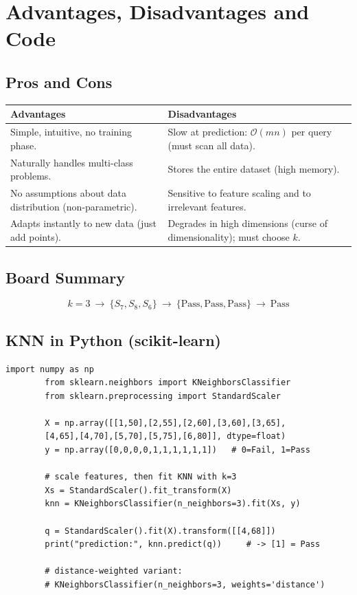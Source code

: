 \documentclass[11pt,a4paper]{report}
\theoremstyle{definition}
\theoremstyle{remark}
\begin{document}
	\chapter{Advantages, Disadvantages and Code}
	
	\section{Pros and Cons}
	\begin{center}
		\begin{tabular}{@{}p{6.4cm}p{6.4cm}@{}}
			\toprule
			\textbf{Advantages} & \textbf{Disadvantages}\\
			\midrule
			Simple, intuitive, no training phase. & Slow at prediction: $\mathcal{O}(mn)$
			per query (must scan all data).\\
			Naturally handles multi-class problems. & Stores the entire dataset (high
			memory).\\
			No assumptions about data distribution (non-parametric). & Sensitive to feature
			scaling and to irrelevant features.\\
			Adapts instantly to new data (just add points). & Degrades in high dimensions
			(curse of dimensionality); must choose $k$.\\
			\bottomrule
		\end{tabular}
	\end{center}
	
	\section{Board Summary}
	\[
	\boxed{\;k=3\ \rightarrow\ \{S_7,S_8,S_6\}\ \rightarrow\
		\{\text{Pass},\text{Pass},\text{Pass}\}\ \rightarrow\ \text{Pass}\;}
	\]
	
	\section{KNN in Python (scikit-learn)}
	\begin{lstlisting}[style=python,caption={Classification and regression with scikit-learn.}]
		import numpy as np
		from sklearn.neighbors import KNeighborsClassifier
		from sklearn.preprocessing import StandardScaler
		
		X = np.array([[1,50],[2,55],[2,60],[3,60],[3,65],
		[4,65],[4,70],[5,70],[5,75],[6,80]], dtype=float)
		y = np.array([0,0,0,0,1,1,1,1,1,1])   # 0=Fail, 1=Pass
		
		# scale features, then fit KNN with k=3
		Xs = StandardScaler().fit_transform(X)
		knn = KNeighborsClassifier(n_neighbors=3).fit(Xs, y)
		
		q = StandardScaler().fit(X).transform([[4,68]])
		print("prediction:", knn.predict(q))     # -> [1] = Pass
		
		# distance-weighted variant:
		# KNeighborsClassifier(n_neighbors=3, weights='distance')
	\end{lstlisting}
	
\end{document}

